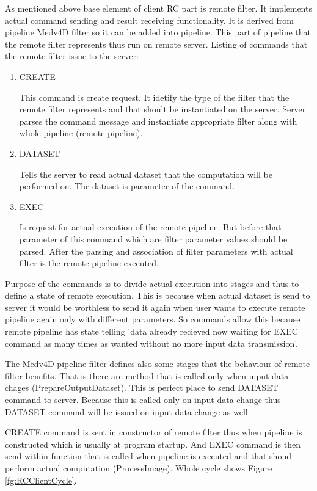 As mentioned above base element of client RC part is remote filter. It implements actual command sending and result receiving functionality. It is derived from pipeline Medv4D filter so it can be added into pipeline. This part of pipeline that the remote filter represents thus run on remote server. Listing of commands that the remote filter issue to the server:
\begin{enumerate}
  \item{CREATE}
  \par
  This command is create request. It idetify the type of the filter that the remote filter represents and that shoult be instantiated on the server. Server parses the command message and instantiate appropriate filter along with whole pipeline (remote pipeline).

  \item{DATASET}
  \par
  Tells the server to read actual dataset that the computation will be performed on. The dataset is parameter of the command.

  \item{EXEC}
\par
  Is request for actual execution of the remote pipeline. But before that parameter of this command which are filter parameter values should be parsed. After the parsing and association of filter parameters with actual filter is the remote pipeline executed.
\end{enumerate}

\par
Purpose of the commands is to divide actual execution into stages and thus to define a state of remote execution. This is because when actual dataset is send to server it would be worthless to send it again when user wants to execute remote pipeline again only with different parameters. So commands allow this because remote pipeline has state telling 'data already recieved now waiting for EXEC command as many times as wanted without no more input data transmission'.
\par
The Medv4D pipeline filter defines also some stages that the behaviour of remote filter benefits. That is there are method that is called only when input data chages (PrepareOutputDataset). This is perfect place to send DATASET command to server. Because this is called only on input data change thus DATASET command will be issued on input data change as well.
\par
CREATE command is sent in constructor of remote filter thus when pipeline is constructed which is usually at program startup. And EXEC command is then send within function that is called when pipeline is executed and that shoud perform actual computation (ProcessImage). Whole cycle shows Figure \ref{fg:RCClientCycle}.

